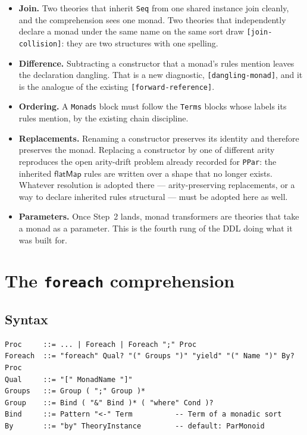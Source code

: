 \documentclass[11pt]{article}
\theoremstyle{branddef}
\theoremstyle{brandplain}
\theoremstyle{brandrem}
\newcommand{\bind}{\mathsf{flatMap}}
\begin{document}
\begin{itemize}[nosep]
\item \textbf{Join.} Two theories that inherit \texttt{Seq} from one shared
instance join cleanly, and the comprehension sees one monad. Two theories that
independently declare a monad under the same name on the same sort draw
\texttt{[join-collision]}: they are two structures with one spelling.
\item \textbf{Difference.} Subtracting a constructor that a monad's rules
mention leaves the declaration dangling. That is a new diagnostic,
\texttt{[dangling-monad]}, and it is the analogue of the existing
\texttt{[forward-reference]}.
\item \textbf{Ordering.} A \texttt{Monads} block must follow the \texttt{Terms}
blocks whose labels its rules mention, by the existing chain discipline.
\item \textbf{Replacements.} Renaming a constructor preserves its identity and
therefore preserves the monad. Replacing a constructor by one of different arity
reproduces the open arity-drift problem already recorded for \texttt{PPar}:
the inherited \(\bind\) rules are written over a shape that no longer exists.
Whatever resolution is adopted there --- arity-preserving replacements, or a way
to declare inherited rules structural --- must be adopted here as well.
\item \textbf{Parameters.} Once Step~2 lands, monad transformers are theories
that take a monad as a parameter. This is the fourth rung of the DDL doing what
it was built for.
\end{itemize}

\section{The \texttt{foreach} comprehension}
\label{sec:cfl}

\subsection{Syntax}

\begin{lstlisting}[language=bnf]
Proc     ::= ... | Foreach | Foreach ";" Proc
Foreach  ::= "foreach" Qual? "(" Groups ")" "yield" "(" Name ")" By? Proc
Qual     ::= "[" MonadName "]"
Groups   ::= Group ( ";" Group )*
Group    ::= Bind ( "&" Bind )* ( "where" Cond )?
Bind     ::= Pattern "<-" Term          -- Term of a monadic sort
By       ::= "by" TheoryInstance        -- default: ParMonoid
\end{lstlisting}
\end{document}
